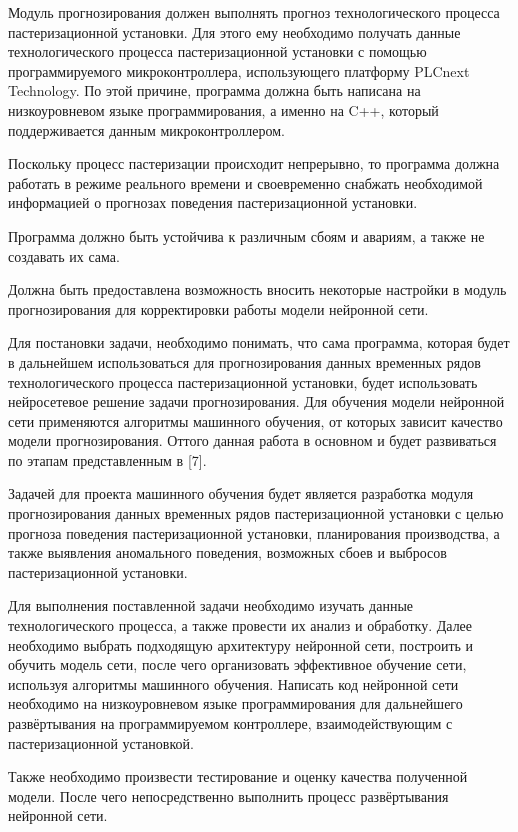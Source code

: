 \subtitlespace

{\gostFont
	
	\par \redline Модуль прогнозирования должен выполнять прогноз технологического процесса пастеризационной установки. Для этого ему необходимо получать данные технологического процесса пастеризационной установки с помощью программируемого микроконтроллера, использующего платформу PLCnext Technology. По этой причине, программа должна быть написана на низкоуровневом языке программирования, а именно на C++, который поддерживается данным микроконтроллером. 
	
	\par \redline Поскольку процесс пастеризации происходит непрерывно, то программа должна работать в режиме реального времени и своевременно снабжать необходимой информацией о прогнозах поведения пастеризационной установки. 
	
	\par \redline Программа должно быть устойчива к различным сбоям и авариям, а также не создавать их сама. 
	
	\par \redline Должна быть предоставлена возможность вносить некоторые настройки в модуль прогнозирования для корректировки работы модели нейронной сети. 
	
	\par \redline Для постановки задачи, необходимо понимать, что сама программа, которая будет в дальнейшем использоваться для прогнозирования данных временных рядов технологического процесса пастеризационной установки, будет использовать нейросетевое решение задачи прогнозирования. Для обучения модели нейронной сети применяются алгоритмы машинного обучения, от которых зависит качество модели прогнозирования. Оттого данная работа в основном и будет развиваться по этапам представленным в [7]. 
	
	\par \redline Задачей для проекта машинного обучения будет является разработка модуля прогнозирования данных временных рядов пастеризационной установки с целью прогноза поведения пастеризационной установки, планирования производства, а также выявления аномального поведения, возможных сбоев и выбросов пастеризационной установки. 
	
	\par \redline Для выполнения поставленной задачи необходимо изучать данные технологического процесса, а также провести их анализ и обработку. Далее необходимо выбрать подходящую архитектуру нейронной сети, построить и обучить модель сети, после чего организовать эффективное обучение сети, используя алгоритмы машинного обучения.  Написать код нейронной сети необходимо на низкоуровневом языке программирования для дальнейшего развёртывания на программируемом контроллере, взаимодействующим с пастеризационной установкой. 
	
	\par \redline Также необходимо произвести тестирование и оценку качества полученной модели. После чего непосредственно выполнить процесс развёртывания нейронной сети.  
	
	\par 
}

